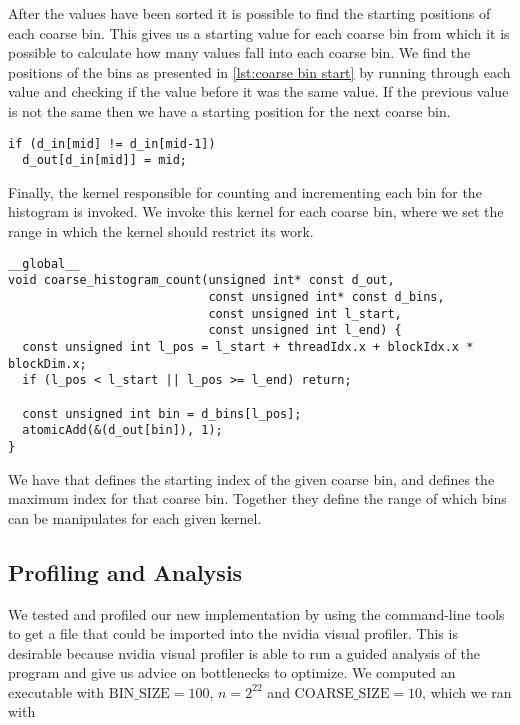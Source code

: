 After the values have been sorted it is possible to find the starting positions of each coarse bin.
This gives us a starting value for each coarse bin from which it is possible to calculate how many values fall into each coarse bin.
We find the positions of the bins as presented in \cref{lst:coarse bin start} by running through each value and checking if the value before it was the same value.
If the previous value is not the same then we have a starting position for the next coarse bin.

\begin{lstlisting}[caption={find the start positions of each coarse bin}, label={lst:coarse bin start}, numbers=none]
if (d_in[mid] != d_in[mid-1])
  d_out[d_in[mid]] = mid;
\end{lstlisting}


Finally, the kernel responsible for counting and incrementing each bin for the histogram is invoked.
We invoke this kernel for each coarse bin, where we set the range in which the kernel should restrict its work.

\begin{lstlisting}[caption={kernel to do histogram count for each coarse bin}, label={lst:coarse histo kernel}]
__global__
void coarse_histogram_count(unsigned int* const d_out,
                            const unsigned int* const d_bins,
                            const unsigned int l_start,
                            const unsigned int l_end) {
  const unsigned int l_pos = l_start + threadIdx.x + blockIdx.x * blockDim.x;
  if (l_pos < l_start || l_pos >= l_end) return;

  const unsigned int bin = d_bins[l_pos];
  atomicAdd(&(d_out[bin]), 1);
}
\end{lstlisting}

We have that  defines the starting index of the given coarse bin, and  defines the maximum index for that coarse bin.
Together they define the range of which bins can be manipulates for each given kernel.

\subsection{Profiling and Analysis}

We tested and profiled our new implementation by using the  command-line tools to get a file that could be imported into the nvidia visual profiler.
This is desirable because nvidia visual profiler is able to run a guided analysis of the program and give us advice on bottlenecks to optimize.
We computed an executable with $\mathrm{BIN\_SIZE}=100$, $n=2^{22}$ and $\mathrm{COARSE\_SIZE}=10$, which we ran with

